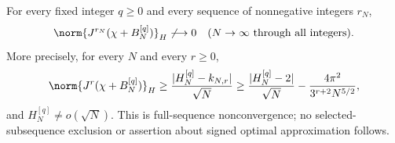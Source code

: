 \begin{proposition}
\label{prop:ns65-cesaro-obstruction}
For every fixed integer $q\geq0$ and every sequence of nonnegative
integers $r_N$,
\[
 \norm{J^{r_N}(\chi+B_N^{[q]})}_H\not\longrightarrow0
 \quad(N\to\infty\text{ through all integers}).
\]
More precisely, for every $N$ and every $r\geq0$,
\begin{equation}
 \norm{J^r(\chi+B_N^{[q]})}_H
 \geq\frac{|H_N^{[q]}-k_{N,r}|}{\sqrt N}
 \geq\frac{|H_N^{[q]}-2|}{\sqrt N}
             -\frac{4\pi^2}{3^{r+2}N^{5/2}},
 \label{eq:ns65-averaged-witness}
\end{equation}
and $H_N^{[q]}\ne o(\sqrt N)$. This is full-sequence nonconvergence;
no selected-subsequence exclusion or assertion about signed optimal
approximation follows.
\end{proposition}
